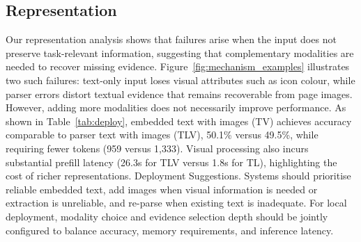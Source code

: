 \documentclass[11pt]{article}
\begin{document}
\subsection{Representation}
\label{sec:implications_representation}
Our representation analysis shows that failures arise when the input does not preserve task-relevant information, suggesting that complementary modalities are needed to recover missing evidence. Figure~\ref{fig:mechanism_examples} illustrates two such failures: text-only input loses visual attributes such as icon colour, while parser errors distort textual evidence that remains recoverable from page images. However, adding more modalities does not necessarily improve performance. As shown in Table~\ref{tab:deploy}, embedded text with images (TV) achieves accuracy comparable to parser text with images (TLV), 50.1\% versus 49.5\%, while requiring fewer tokens (959 versus 1,333). Visual processing also incurs substantial prefill latency (26.3s for TLV versus 1.8s for TL), highlighting the cost of richer representations. Deployment Suggestions. Systems should prioritise reliable embedded text, add images when visual information is needed or extraction is unreliable, and re-parse when existing text is inadequate. For local deployment, modality choice and evidence selection depth should be jointly configured to balance accuracy, memory requirements, and inference latency.
\end{document}
